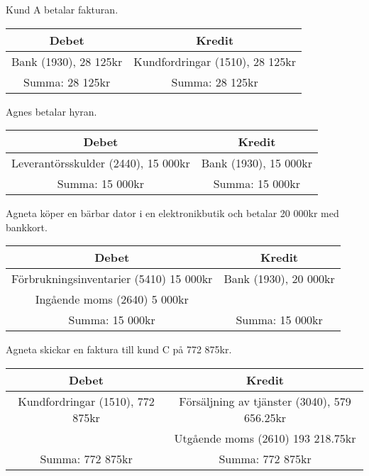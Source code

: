 \documentclass[a4paper, titlepage,12pt]{article}
\begin{document}
			Kund A betalar fakturan.
			\begin{center}
				\begin{tabular}{|c|c|}
					\hline
					\textbf{Debet} & \textbf{Kredit} \\
					\hline
					Bank (1930), 28 125kr &  Kundfordringar (1510), 28 125kr\\
					\hline
					Summa: 28 125kr & Summa: 28 125kr\\
					\hline
				\end{tabular}
			\end{center}


			Agnes betalar hyran.
			\begin{center}
				\begin{tabular}{|c|c|}
					\hline
					\textbf{Debet} & \textbf{Kredit} \\
					\hline
					Leverantörsskulder (2440), 15 000kr & Bank (1930), 15 000kr \\
					\hline
					Summa: 15 000kr & Summa: 15 000kr\\
					\hline
				\end{tabular}
			\end{center}


			Agneta köper en bärbar dator i en elektronikbutik och betalar 20 000kr med bankkort.
			\begin{center}
				\begin{tabular}{|c|c|}
					\hline
					\textbf{Debet} & \textbf{Kredit} \\
					\hline
					Förbrukningsinventarier (5410) 15 000kr & Bank (1930), 20 000kr \\
					\hline
					Ingående moms (2640) 5 000kr & \\
					\hline
					Summa: 15 000kr & Summa: 15 000kr\\
					\hline
				\end{tabular}
			\end{center}


			Agneta skickar en faktura till kund C på 772 875kr.
			\begin{center}
				\begin{tabular}{|c|c|}
					\hline
					\textbf{Debet} & \textbf{Kredit} \\
					\hline
					Kundfordringar (1510), 772 875kr & Försäljning av tjänster (3040), 579 656.25kr \\
					\hline
					& Utgående moms (2610) 193 218.75kr \\
					\hline
					Summa: 772 875kr & Summa: 772 875kr\\
					\hline
				\end{tabular}
			\end{center}
\end{document}
